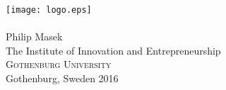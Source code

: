\begin{titlepage}


\mbox{}
\addtolength{\voffset}{2cm}
\begin{center}
	\texttt{[image: logo.eps]}
	{\noindent {}} \\[4cm]
	{ \\[3.5cm]
	{\Large Philip Masek }\\[3.5cm]

	
	{\Large The Institute of Innovation and Entrepreneurship \\
	\textsc{Gothenburg University} \\
	Gothenburg, Sweden 2016 \\
	}
	}
\end{center}

\end{titlepage}
\ClearShipoutPicture
\mbox{}